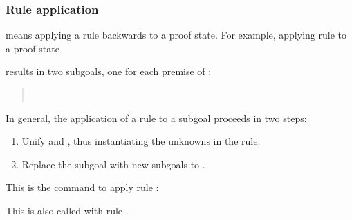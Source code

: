 \begin{isabellebody}
\begin{isamarkuptext}
\subsubsection{Rule application}

 means applying a rule backwards to a proof state.
For example, applying rule  to a proof state
\begin{quote}
\end{quote}
results in two subgoals, one for each premise of :
\begin{quote}
\\
\end{quote}
In general, the application of a rule 
to a subgoal \mbox{} proceeds in two steps:
\begin{enumerate}
\item
Unify  and , thus instantiating the unknowns in the rule.
\item
Replace the subgoal  with  new subgoals  to .
\end{enumerate}
This is the command to apply rule :
\begin{quote}
\end{quote}
This is also called  with rule .


\end{isamarkuptext}
\end{isabellebody}
